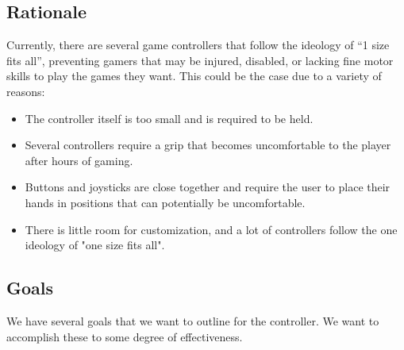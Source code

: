 \documentclass[a4]{article}
\begin{document}
\subsection{Rationale}
Currently, there are several game controllers that follow the ideology of “1 size fits all”, preventing gamers that may be injured, disabled, or lacking fine motor 
skills to play the games they want. This could be the case due to a variety of reasons:
\begin{itemize}
    \item The controller itself is too small and is required to be held.
    \item Several controllers require a grip that becomes uncomfortable to the player after hours of gaming.
    \item Buttons and joysticks are close together and require the user to place their hands in positions that can potentially be uncomfortable.
    \item There is little room for customization, and a lot of controllers follow the one ideology of "one size fits all".  
\end{itemize}

\subsection{Goals}
We have several goals that we want to outline for the controller. We want to accomplish these to some degree of effectiveness.
\end{document}

